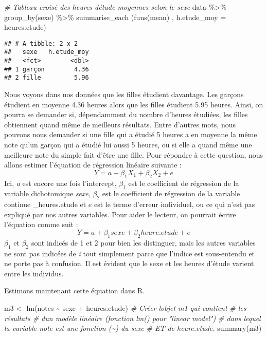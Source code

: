 \documentclass[
]{book}
\newenvironment{Shaded}{\begin{snugshade}}{\end{snugshade}}
\newcommand{\AttributeTok}[1]{\textcolor[rgb]{0.77,0.63,0.00}{#1}}
\newcommand{\CommentTok}[1]{\textcolor[rgb]{0.56,0.35,0.01}{\textit{#1}}}
\newcommand{\FunctionTok}[1]{\textcolor[rgb]{0.00,0.00,0.00}{#1}}
\newcommand{\NormalTok}[1]{#1}
\newcommand{\OtherTok}[1]{\textcolor[rgb]{0.56,0.35,0.01}{#1}}
\newcommand{\SpecialCharTok}[1]{\textcolor[rgb]{0.00,0.00,0.00}{#1}}
\begin{document}
\begin{Shaded}
\begin{Highlighting}[]
\CommentTok{\# Tableau croisé des heures d\textquotesingle{}étude moyennes selon le sexe}
\NormalTok{data }\SpecialCharTok{\%\textgreater{}\%} 
  \FunctionTok{group\_by}\NormalTok{(sexe) }\SpecialCharTok{\%\textgreater{}\%} 
  \FunctionTok{summarise\_each}\NormalTok{ (}\FunctionTok{funs}\NormalTok{(mean) , }\AttributeTok{h.etude\_moy =}\NormalTok{ heures.etude)}
\end{Highlighting}
\end{Shaded}

\begin{verbatim}
## # A tibble: 2 x 2
##   sexe   h.etude_moy
##   <fct>        <dbl>
## 1 garçon        4.36
## 2 fille         5.96
\end{verbatim}

Nous voyons dans nos données que les filles étudient davantage. Les garçons étudient en moyenne 4.36 heures alors que les filles étudient 5.95 heures. Ainsi, on pourra se demander si, dépendamment du nombre d'heures étudiées, les filles obtiennent quand même de meilleurs résultats. Entre d'autres mots, nous pouvons nous demander si une fille qui a étudié 5 heures a en moyenne la même note qu'un garçon qui a étudié lui aussi 5 heures, ou si elle a quand même une meilleure note du simple fait d'être une fille. Pour répondre à cette question, nous allons estimer l'équation de régression linéaire suivante :
\[ Y =  a + \beta_1X_1 + \beta_2X_2 + e  \]
Ici, \emph{a} est encore une fois l'intercept, \(\beta_1\) est le coefficient de régression de la variable dichotomique \emph{sexe}, \(\beta_2\) est le coefficient de régression de la variable continue \_heures.etude et \(e\) est le terme d'erreur individuel, ou ce qui n'est pas expliqué par nos autres variables. Pour aider le lecteur, on pourrait écrire l'équation comme suit :
\[ Y =  a + \beta_1 sexe + \beta_2 heure.etude + e  \]
\(\beta_1\) et \(\beta_2\) sont indicés de 1 et 2 pour bien les distinguer, mais les autres variables ne sont pas indicées de \emph{i} tout simplement parce que l'indice est sous-entendu et ne porte pas à confusion. Il est évident que le sexe et les heures d'étude varient entre les individus.

Estimons maintenant cette équation dans R.

\begin{Shaded}
\begin{Highlighting}[]
\NormalTok{m3 }\OtherTok{\textless{}{-}} \FunctionTok{lm}\NormalTok{(notes }\SpecialCharTok{\textasciitilde{}}\NormalTok{ sexe }\SpecialCharTok{+}\NormalTok{ heures.etude) }\CommentTok{\# Créer l\textquotesingle{}objet m1 qui contient}
\CommentTok{\# les résultats \# d\textquotesingle{}un modèle linéaire (fonction lm() pour "linear model")}
\CommentTok{\# dans lequel la variable note est une fonction (\textasciitilde{}) du sexe }
\CommentTok{\# ET de heure.etude.}
\FunctionTok{summary}\NormalTok{(m3)}
\end{Highlighting}
\end{Shaded}
\end{document}
